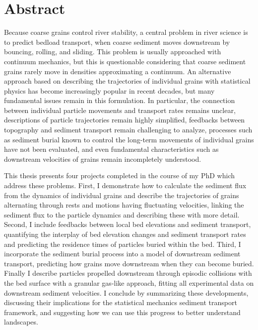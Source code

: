 
\chapter{Abstract}


Because coarse grains control river stability, a central problem in river science is to predict bedload transport, when coarse sediment moves downstream by bouncing, rolling, and sliding.
This problem is usually approached with continuum mechanics, but this is questionable considering that coarse sediment grains rarely move in densities approximating a continuum.
An alternative approach based on describing the trajectories of individual grains with statistical physics has become increasingly popular in recent decades, but many fundamental issues remain in this formulation.
In particular, the connection between individual particle movements and transport rates remains unclear, descriptions of particle trajectories remain highly simplified, feedbacks between topography and sediment transport remain challenging to analyze, processes such as sediment burial known to control the long-term movements of individual grains have not been evaluated, and even fundamental characteristics such as downstream velocities of grains remain incompletely understood.

This thesis presents four projects completed in the course of my PhD which address these problems.
First, I demonstrate how to calculate the sediment flux from the dynamics of individual grains and describe the trajectories of grains alternating through rests and motions having fluctuating velocities, linking the sediment flux to the particle dynamics and describing these with more detail.
Second, I include feedbacks between local bed elevations and sediment transport, quantifying the interplay of bed elevation changes and sediment transport rates and predicting the residence times of particles buried within the bed.
Third, I incorporate the sediment burial process into a model of downstream sediment transport, predicting how grains move downstream when they can become buried.
Finally I describe particles propelled downstream through episodic collisions with the bed surface with a granular gas-like approach, fitting all experimental data on downstream sediment velocities.
I conclude by summarizing these developments, discussing their implications for the statistical mechanics sediment transport framework, and suggesting how we can use this progress to better understand landscapes.


